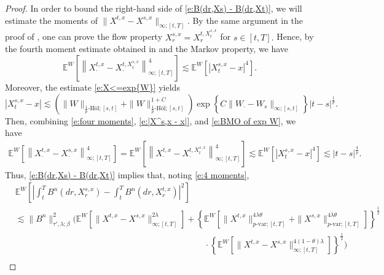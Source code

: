 \documentclass[11pt,reqno]{amsart}
\def\E{\mathbb E}
\numberwithin{equation}{section}
\begin{document}
\begin{proof}
In order to bound the right-hand side of \eqref{e:B(dr,Xs) - B(dr,Xt)}, we will estimate the moments of $\|X^{t,x} - X^{s,x}\|_{\infty;[t,T]}$. By the same argument in the proof of \cite[Theorem~5.1.2]{zhang2017backward}, one can prove the flow property $X^{s,x}_{r} = X^{t,X^{s,x}_{t}}_{r}$ for $s\in[t,T].$ Hence, by the 
fourth moment estimate obtained in \cite[Proposition~3.1]{PardouxZhanggeneralized} and the Markov property, we have
\begin{equation}\label{e:four moments}
\mathbb{E}^{W}\left[\left\|X^{t,x}_{\cdot} - X^{t,X^{s,x}_{t}}_{\cdot}\right\|^{4}_{\infty;[t,T]}\right]\lesssim \mathbb{E}^{W}\left[\left|X^{s,x}_{t} - x\right|^{4}\right].
\end{equation}
Moreover, the estimate \eqref{e:X<=exp{W}} yields
\begin{equation}\label{e:|X^s,x - x|}
\left|X^{s,x}_{t} - x\right|\lesssim \left(\|W\|_{\frac{1}{p}\text{-H\"ol};[s,t]} + \|W\|^{1 + C}_{\frac{1}{p}\text{-H\"ol};[s,t]}\right)\exp\left\{C\|W_{\cdot} - W_{s}\|_{\infty;[s,t]}\right\} |t-s|^{\frac{1}{p}}.
\end{equation}
Then, combining \eqref{e:four moments}, \eqref{e:|X^s,x - x|}, and \eqref{e:BMO of exp W}, we have 
\begin{equation}\label{e:4 moments}
\begin{aligned}
\E^{W}\left[\left\|X^{t,x}_{\cdot} - X^{s,x}_{\cdot}\right\|^{4}_{\infty;[t,T]}\right] = \mathbb{E}^{W}\left[\left\|X^{t,x}_{\cdot} - X^{t,X^{s,x}_{t}}_{\cdot}\right\|^{4}_{\infty;[t,T]}\right]\lesssim \mathbb{E}^{W}\left[\left|X^{s,x}_{t} - x\right|^{4}\right]\lesssim |t-s|^{\frac{4}{p}}.
\end{aligned}
\end{equation}
Thus,  \eqref{e:B(dr,Xs) - B(dr,Xt)} implies that,   noting \eqref{e:4 moments}, 
\begin{equation}\label{e:B(t,X^s) - B(t,X^t)}
\begin{aligned}
&\mathbb{E}^{W}\left[\left|\int_{t}^{T}B^{n}(dr,X^{s,x}_{r}) - \int_{t}^{T}B^{n}(dr,X^{t,x}_{r})\right|^{2}\right]\\
&\lesssim \|B^{n}\|^{2}_{\tau',\lambda;\beta}\Bigg(\mathbb{E}^{W}\left[ \|X^{t,x} - X^{s,x}\|^{2\lambda}_{\infty;[t,T]} \right] + \left\{\E^{W}\left[\|X^{t,x}\|^{4\lambda\theta}_{p\text{-var};[t,T]} + \|X^{s,x}\|^{4\lambda\theta}_{p\text{-var};[t,T]}\right]\right\}^{\frac{1}{2}}\\
&\qquad\qquad\qquad\qquad\qquad\qquad\qquad\qquad\qquad\qquad\qquad\cdot  \left\{ \E^{W}\left[\|X^{t,x} - X^{s,x}\|^{4(1-\theta)\lambda}_{\infty;[t,T]} \right]\right\}^{\frac{1}{2}}\Bigg)\\

\end{aligned}
\end{equation}
\end{proof}
\end{document}
